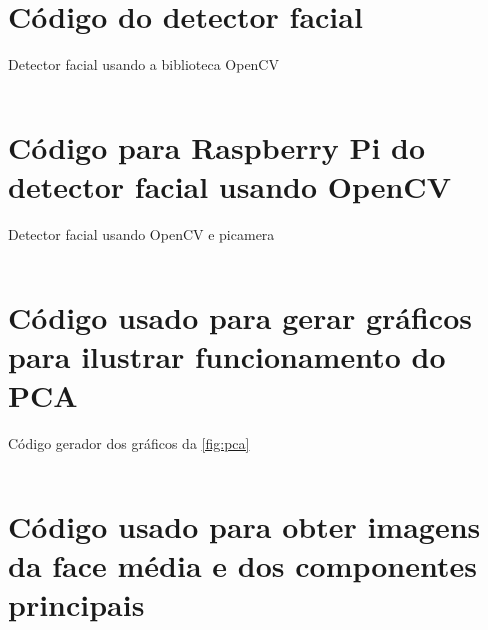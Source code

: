
\begin{apendicesenv}

\partapendices

\chapter{Código do detector facial}\label{cap:anexo_detector_facial_opencv}

\begin{code}
\caption{Detector facial usando a biblioteca OpenCV}
\label{cod:detector_facial_opencv}
\inputminted{python}{codigos/detector_facial.py}
\end{code}

\chapter{Código para Raspberry Pi do detector facial usando OpenCV}\label{cap:anexo_detector_raspberry}

\begin{code}
\caption{Detector facial usando OpenCV e picamera}
\label{cod:detector_opencv_picamera}
\inputminted{python}{codigos/detector_facial_picamera.py}
\end{code}

\chapter{Código usado para gerar gráficos para ilustrar funcionamento do PCA}\label{cap:ilustra_pca}

\begin{code}
\caption{Código gerador dos gráficos da \autoref{fig:pca}}
\label{cod:ilustra_pca}
\inputminted{python}{codigos/eigenfaces.py}
\end{code}

\chapter{Código usado para obter imagens da face média e dos componentes principais}\label{cap:pca_opencv}


\end{apendicesenv}
